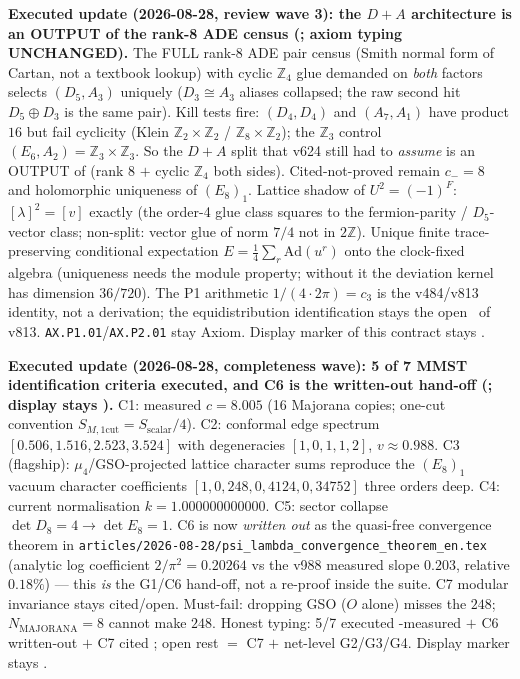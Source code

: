 \documentclass[11pt,a4paper]{article}
\begin{document}
\par\smallskip\noindent\textbf{Executed update (2026-08-28, review wave 3): the $D{+}A$ architecture
is an OUTPUT of the rank-8 ADE census
(; axiom typing
UNCHANGED).}
The FULL rank-8 ADE pair census (Smith normal form of Cartan, not a textbook lookup) with cyclic
$\mathbb Z_4$ glue demanded on \emph{both} factors selects $(D_5,A_3)$ uniquely ($D_3\cong A_3$
aliases collapsed; the raw second hit $D_5\oplus D_3$ is the same pair).  Kill tests fire: $(D_4,D_4)$
and $(A_7,A_1)$ have product $16$ but fail cyclicity (Klein $\mathbb Z_2\times\mathbb Z_2$ /
$\mathbb Z_8\times\mathbb Z_2$); the $\mathbb Z_3$ control $(E_6,A_2)=\mathbb Z_3\times\mathbb Z_3$.
So the $D{+}A$ split that v624 still had to \emph{assume} is an OUTPUT of (rank $8$ $+$ cyclic
$\mathbb Z_4$ both sides).  Cited-not-proved remain $c_-=8$ and holomorphic uniqueness of $(E_8)_1$.
Lattice shadow of $U^2=(-1)^F$: $[\lambda]^2=[v]$ exactly (the order-4 glue class squares to the
fermion-parity / $D_5$-vector class; non-split: vector glue of norm $7/4$ not in $2\mathbb Z$).
Unique finite trace-preserving conditional expectation $E=\tfrac14\sum_r\mathrm{Ad}(u^r)$ onto the
clock-fixed algebra (uniqueness needs the module property; without it the deviation kernel has
dimension $36/720$).  The P1 arithmetic $1/(4\cdot 2\pi)=c_3$ is the v484/v813 identity, not a
derivation; the equidistribution identification stays the open \mC\ of v813.
\texttt{AX.P1.01}/\texttt{AX.P2.01} stay Axiom.  Display marker of this contract stays \mO.

\par\smallskip\noindent\textbf{Executed update (2026-08-28, completeness wave): 5 of 7 MMST
identification criteria executed, and C6 is the written-out hand-off
(; display stays \mO).}
C1: measured $c=8.005$ (16 Majorana copies; one-cut convention $S_{M,1\mathrm{cut}}=S_{\mathrm{scalar}}/4$).
C2: conformal edge spectrum $[0.506,1.516,2.523,3.524]$ with degeneracies $[1,0,1,1,2]$, $v\approx0.988$.
C3 (flagship): $\mu_4$/GSO-projected lattice character sums reproduce the $(E_8)_1$ vacuum character
coefficients $[1,0,248,0,4124,0,34752]$ three orders deep.  C4: current normalisation
$k=1.000000000000$.  C5: sector collapse $\det D_8=4\to\det E_8=1$.
C6 is now \emph{written out} as the quasi-free convergence theorem in
\texttt{articles/2026-08-28/psi\_lambda\_convergence\_theorem\_en.tex} (analytic log coefficient
$2/\pi^2=0.20264$ vs the v988 measured slope $0.203$, relative $0.18\%$) --- this \emph{is} the
G1/C6 hand-off, not a re-proof inside the suite.  C7 modular invariance stays cited/open.
Must-fail: dropping GSO ($O$ alone) misses the $248$; $N_{\mathrm{MAJORANA}}=8$ cannot make $248$.
Honest typing: 5/7 executed \mE-measured $+$ C6 written-out \mC $+$ C7 cited \mO; open rest $=$
C7 $+$ net-level G2/G3/G4.  Display marker stays \mO.
\end{document}
